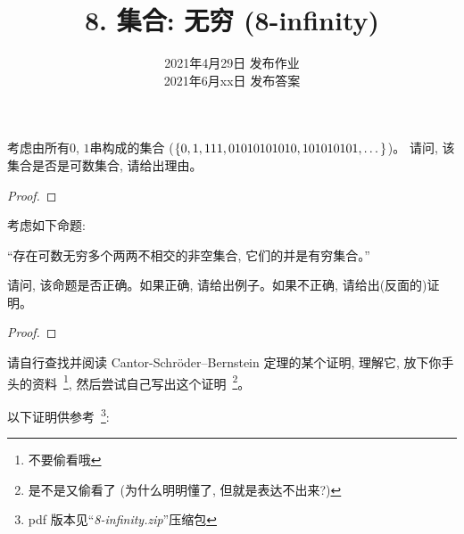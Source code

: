 \documentclass[a4paper, justified]{tufte-handout}
\title{8. 集合: 无穷 (8-infinity)}
\date{2021年4月29日 发布作业 \\ 2021年6月xx日 发布答案}
\begin{document}
\maketitle
\noplagiarism %
\begin{abstract}
\end{abstract}
\beginrequired

\begin{problem}
  考虑由所有$0$, $1$串构成的集合 ($\{0, 1, 111, 01010101010, 101010101, \dots\}$)。
  请问, 该集合是否是可数集合, 请给出理由。
\end{problem}

\begin{proof}
\end{proof}

\begin{problem}
  考虑如下命题:

  ``存在可数无穷多个两两不相交的非空集合, 它们的并是有穷集合。''

  \noindent 请问, 该命题是否正确。如果正确, 请给出例子。如果不正确, 请给出(反面的)证明。
\end{problem}

\begin{proof}
\end{proof}

\begin{problem}
  请自行查找并阅读 Cantor-Schr\"{o}der–Bernstein 定理的某个证明,
  理解它, 放下你手头的资料~\footnote{不要偷看哦}, 然后尝试自己写出这个证明~\footnote{
    是不是又偷看了 (为什么明明懂了, 但就是表达不出来?)}。

  \vspace{1em}
  \noindent 以下证明供参考~\footnote{pdf 版本见``\textsl{8-infinity.zip}''压缩包}:
  {\href{https://en.wikipedia.org/wiki/Schr\%C3\%B6der\%E2\%80\%93Bernstein\_theorem}{}}
\end{problem}
\end{document}
